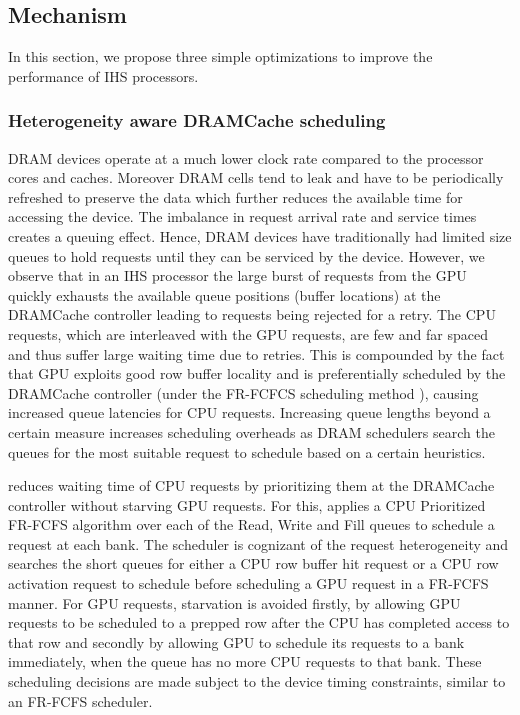 \newcommand{\bypassname}{\textit{ByE }}
\newcommand{\prioname}{\textit{PrIS }}
\newcommand{\chaining}{\textit{Chaining }}
\subsection{\cachename Mechanism} \label{mechanism}
In this section, we propose three simple optimizations to improve the performance of IHS processors.

\subsubsection{Heterogeneity aware DRAMCache scheduling} \label{mechanism-pris}
DRAM devices operate at a much lower clock rate compared to the processor cores and caches. Moreover DRAM cells tend to leak and have to be periodically refreshed to preserve the data which further reduces the available time for accessing the device. The imbalance in request arrival rate and service times creates a queuing effect. Hence, DRAM devices have traditionally had limited size queues to hold requests until they can be serviced by the device. However, we observe that in an IHS processor the large burst of requests from the GPU quickly exhausts the available queue positions (buffer locations) at the DRAMCache controller leading to requests being rejected for a retry. The CPU requests, which are interleaved with the GPU requests, are few and far spaced and thus suffer large waiting time due to retries. This is compounded by the fact that GPU exploits good row buffer locality and is preferentially scheduled by the DRAMCache controller (under the FR-FCFCS scheduling method \cite{sms}), causing increased queue latencies for CPU requests. Increasing queue lengths beyond a certain measure increases scheduling overheads as DRAM schedulers search the queues for the most suitable request to schedule based on a certain heuristics.
\par \cachename reduces waiting time of CPU requests by prioritizing them at the DRAMCache controller without starving GPU requests. 
For this, \cachename applies a CPU Prioritized FR-FCFS algorithm over each of the Read, Write and Fill queues to schedule a request at each bank. 
The scheduler is cognizant of the request heterogeneity and searches the short queues for either a CPU row buffer hit request or a CPU row activation request to schedule before scheduling a GPU request in a FR-FCFS manner. For GPU requests, starvation is avoided firstly, by allowing GPU requests to be scheduled to a prepped row after the CPU has completed access to that row and secondly by allowing GPU to schedule its requests to a bank immediately, when the queue has no more CPU requests to that bank. These scheduling decisions are made subject to the device timing constraints, similar to an FR-FCFS scheduler.
